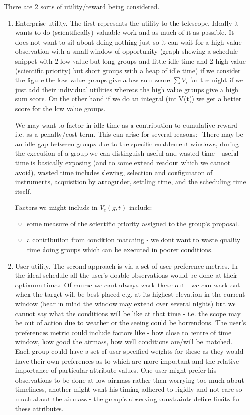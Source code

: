 There are 2 sorts of utility/reward being considered.

\begin{enumerate}
\item Enterprise utility.
The first represents the utility to the telescope, Ideally it wants to do (scientifically) valuable work and as much of it as possible. It does not want to sit about doing nothing just so it can wait for a high value observation with a small window of opportunity (graph showing a schedule snippet with 2 low value but long groups and little idle time and 2 high value (scientific priority) but short groups with a heap of idle time) if we consider the figure the low value groups give a low sum score $\sum V_i$ for the night if we just add their individual utilities whereas the high value groups give a high sum score. On the other hand if we do an integral (int V(t)) we get a better score for the low value groups. 

We may want to factor in idle time as a contribution to cumulative reward i.e. as a penalty/cost term. This can arise for several reasons:-
There may be an idle gap between groups due to the specific enablement windows, during the execution of a group we can distinguish useful and wasted time - useful time is basically exposing (and to some extend readout which we cannot avoid), wasted time includes slewing, selection and configuraton of instruments, acquisition by autoguider, settling time, and the scheduling time itself. 

Factors we might include in $V_e(g,t)$ include:-
\begin{itemize}
\item some measure of the scientific priority assigned to the group's proposal.
\item a contribution from condition matching - we dont want to waste quality time doing groups which can be executed in poorer conditions.
\end{itemize}


\item User utility.
The second approach is via a set of user-preference metrics. In the ideal schedule all the user's doable observations would be done at their optimum times. Of course we cant always work these out - we can work out when the target will be best placed e.g. at its highest elevation in the current window (bear in mind the window may extend over several nights) but we cannot say what the conditions will be like at that time - i.e. the scope may be out of action due to weather or the seeing could be horrendous. The user's preferences metric could include factors like - how close to centre of time window, how good the airmass, how well conditions are/will be matched. Each group could have a set of user-specified weights for these as they would have their own preferences as to which are more important and the relative importance of particular attribute values. One user might prefer his observations to be done at low airmass rather than worrying too much about timeliness, another might want his timing adhered to rigidly and not care so much about the airmass - the group's observing constraints define limits for these attributes.


\end{enumerate}
